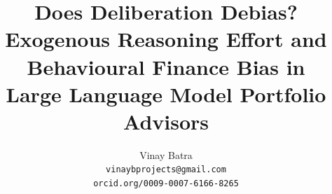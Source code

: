 \newif\ifsubmission

\newcommand{\movedhead}[1]{\ifsubmission\else\subsection{#1}\fi}

\newcommand{\movedref}[1]{\ifsubmission Appendix\else Section\fi~\ref{#1}}


\newcommand{\repourl}{\ifsubmission%
[anonymised archive URL to be added]\else%
\url{https://github.com/vinay-batra/advisor-bias-study}\fi}

\newcommand{\us}{\_\discretionary{}{}{}}

\title{Does Deliberation Debias? Exogenous Reasoning Effort and
Behavioural Finance Bias in\\Large Language Model Portfolio Advisors}

\author{Vinay Batra\\\texttt{vinaybprojects@gmail.com}\\\texttt{orcid.org/0009-0007-6166-8265}}
\date{}
